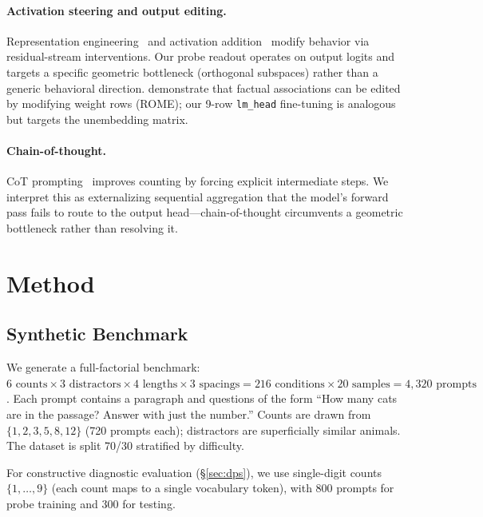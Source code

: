 \documentclass{article}
\begin{document}
\paragraph{Activation steering and output editing.}
Representation engineering~\citep{zou2023representation} and activation addition~\citep{turner2023activation} modify behavior via residual-stream interventions.
Our probe readout operates on output logits and targets a specific geometric bottleneck (orthogonal subspaces) rather than a generic behavioral direction.
\citet{meng2022locating} demonstrate that factual associations can be edited by modifying weight rows (ROME); our 9-row \texttt{lm\_head} fine-tuning is analogous but targets the unembedding matrix.

\paragraph{Chain-of-thought.}
CoT prompting~\citep{wei2022chain} improves counting by forcing explicit intermediate steps.
We interpret this as externalizing sequential aggregation that the model's forward pass fails to route to the output head---chain-of-thought circumvents a geometric bottleneck rather than resolving it.

\section{Method}
\label{sec:method}

\subsection{Synthetic Benchmark}

We generate a full-factorial benchmark:
$6 \text{ counts} \times 3 \text{ distractors} \times 4 \text{ lengths} \times 3 \text{ spacings}
= 216 \text{ conditions} \times 20 \text{ samples} = 4{,}320 \text{ prompts}$.
Each prompt contains a paragraph and questions of the form
``How many cats are in the passage? Answer with just the number.''
Counts are drawn from $\{1, 2, 3, 5, 8, 12\}$ (720 prompts each);
distractors are superficially similar animals.
The dataset is split 70/30 stratified by difficulty.

For constructive diagnostic evaluation (\S\ref{sec:dps}), we use single-digit counts $\{1, \ldots, 9\}$
(each count maps to a single vocabulary token), with 800 prompts for probe training and 300 for testing.
\end{document}

